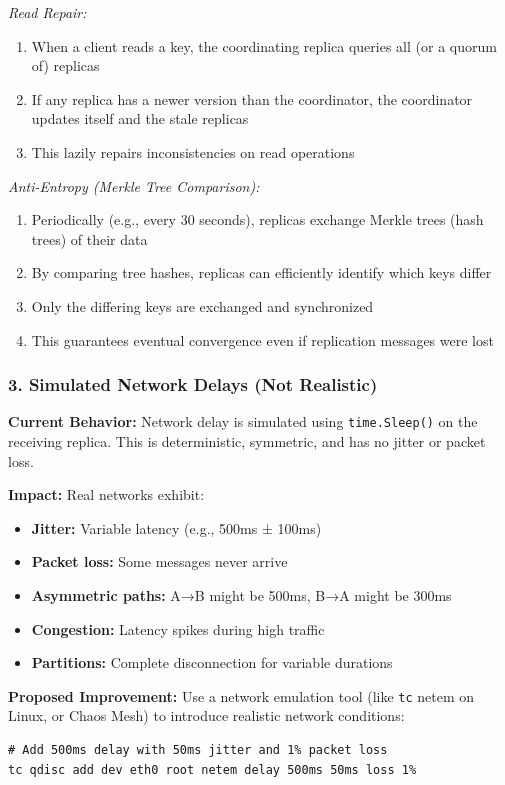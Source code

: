 \documentclass[10pt,a4paper]{article}
\begin{document}
\textit{Read Repair:}
\begin{enumerate}
    \item When a client reads a key, the coordinating replica queries all (or a quorum of) replicas
    \item If any replica has a newer version than the coordinator, the coordinator updates itself and the stale replicas
    \item This lazily repairs inconsistencies on read operations
\end{enumerate}

\textit{Anti-Entropy (Merkle Tree Comparison):}
\begin{enumerate}
    \item Periodically (e.g., every 30 seconds), replicas exchange Merkle trees (hash trees) of their data
    \item By comparing tree hashes, replicas can efficiently identify which keys differ
    \item Only the differing keys are exchanged and synchronized
    \item This guarantees eventual convergence even if replication messages were lost
\end{enumerate}

\subsubsection{3. Simulated Network Delays (Not Realistic)}

\textbf{Current Behavior:} Network delay is simulated using \texttt{time.Sleep()} on the receiving replica. This is deterministic, symmetric, and has no jitter or packet loss.

\textbf{Impact:} Real networks exhibit:
\begin{itemize}
    \item \textbf{Jitter:} Variable latency (e.g., 500ms ± 100ms)
    \item \textbf{Packet loss:} Some messages never arrive
    \item \textbf{Asymmetric paths:} A→B might be 500ms, B→A might be 300ms
    \item \textbf{Congestion:} Latency spikes during high traffic
    \item \textbf{Partitions:} Complete disconnection for variable durations
\end{itemize}

\textbf{Proposed Improvement:} Use a network emulation tool (like \texttt{tc} netem on Linux, or Chaos Mesh) to introduce realistic network conditions:
\begin{verbatim}
# Add 500ms delay with 50ms jitter and 1% packet loss
tc qdisc add dev eth0 root netem delay 500ms 50ms loss 1%
\end{verbatim}
\end{document}
